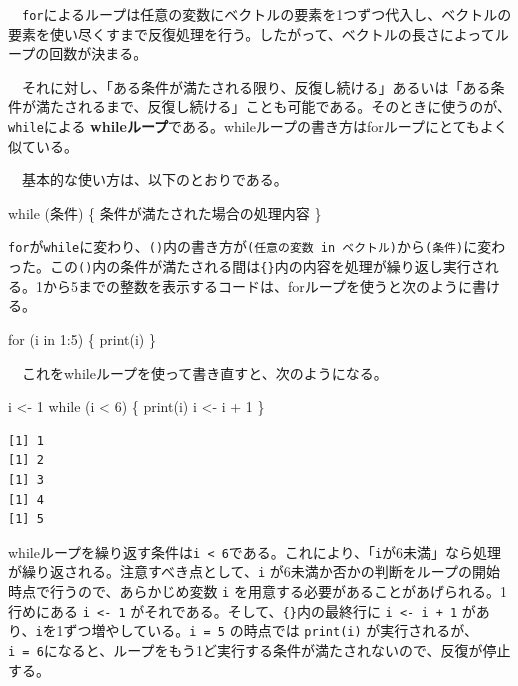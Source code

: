 \documentclass[
  a4paper,
  pandoc,
  ja=standard,
  jafont=haranoaji]{bxjsbook}
\newenvironment{Shaded}{\begin{snugshade}}{\end{snugshade}}
\newcommand{\ControlFlowTok}[1]{\textcolor[rgb]{0.00,0.48,0.65}{#1}}
\newcommand{\DecValTok}[1]{\textcolor[rgb]{0.68,0.00,0.00}{#1}}
\newcommand{\FunctionTok}[1]{\textcolor[rgb]{0.28,0.35,0.67}{#1}}
\newcommand{\NormalTok}[1]{\textcolor[rgb]{0.00,0.48,0.65}{#1}}
\newcommand{\OtherTok}[1]{\textcolor[rgb]{0.00,0.48,0.65}{#1}}
\newcommand{\SpecialCharTok}[1]{\textcolor[rgb]{0.37,0.37,0.37}{#1}}
\begin{document}
　\texttt{for}によるループは任意の変数にベクトルの要素を1つずつ代入し、ベクトルの要素を使い尽くすまで反復処理を行う。したがって、ベクトルの長さによってループの回数が決まる。

　それに対し、「ある条件が満たされる限り、反復し続ける」あるいは「ある条件が満たされるまで、反復し続ける」ことも可能である。そのときに使うのが、\texttt{while}による
\textbf{whileループ}である。whileループの書き方はforループにとてもよく似ている。

　基本的な使い方は、以下のとおりである。

\begin{Shaded}
\begin{Highlighting}[]
\ControlFlowTok{while}\NormalTok{ (条件) \{}
\NormalTok{  条件が満たされた場合の処理内容}
\NormalTok{\}}
\end{Highlighting}
\end{Shaded}

\texttt{for}が\texttt{while}に変わり、\texttt{()}内の書き方が\texttt{(任意の変数\ in\ ベクトル)}から\texttt{(条件)}に変わった。この\texttt{()}内の条件が満たされる間は\texttt{\{\}}内の内容を処理が繰り返し実行される。1から5までの整数を表示するコードは、forループを使うと次のように書ける。

\begin{Shaded}
\begin{Highlighting}[numbers=left,,]
\ControlFlowTok{for}\NormalTok{ (i }\ControlFlowTok{in} \DecValTok{1}\SpecialCharTok{:}\DecValTok{5}\NormalTok{) \{}
  \FunctionTok{print}\NormalTok{(i)}
\NormalTok{\}}
\end{Highlighting}
\end{Shaded}

　これをwhileループを使って書き直すと、次のようになる。

\begin{Shaded}
\begin{Highlighting}[numbers=left,,]
\NormalTok{i }\OtherTok{\textless{}{-}} \DecValTok{1}
\ControlFlowTok{while}\NormalTok{ (i }\SpecialCharTok{\textless{}} \DecValTok{6}\NormalTok{) \{}
  \FunctionTok{print}\NormalTok{(i)}
\NormalTok{  i }\OtherTok{\textless{}{-}}\NormalTok{ i }\SpecialCharTok{+} \DecValTok{1}
\NormalTok{\}}
\end{Highlighting}
\end{Shaded}

\begin{verbatim}
[1] 1
[1] 2
[1] 3
[1] 4
[1] 5
\end{verbatim}

whileループを繰り返す条件は\texttt{i\ \textless{}\ 6}である。これにより、「\texttt{i}が6未満」なら処理が繰り返される。注意すべき点として、\texttt{i}
が6未満か否かの判断をループの開始時点で行うので、あらかじめ変数
\texttt{i} を用意する必要があることがあげられる。1行めにある
\texttt{i\ \textless{}-\ 1}
がそれである。そして、\texttt{\{\}}内の最終行に
\texttt{i\ \textless{}-\ i\ +\ 1}
があり、\texttt{i}を1ずつ増やしている。\texttt{i\ =\ 5} の時点では
\texttt{print(i)}
が実行されるが、\texttt{i\ =\ 6}になると、ループをもう1ど実行する条件が満たされないので、反復が停止する。
\end{document}

